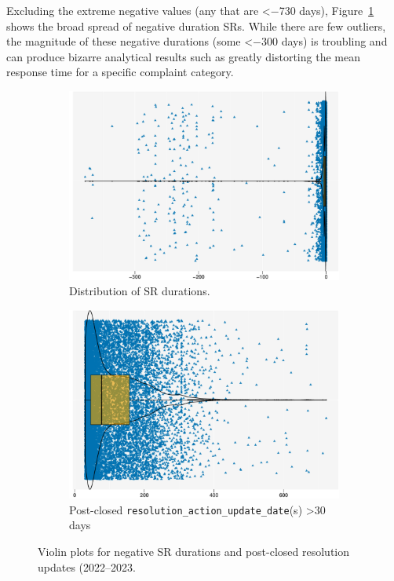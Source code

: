 \documentclass[linenumber]{jdsart}
\begin{document}
Excluding the extreme negative values (any that are <$-$730 days), 
Figure~\ref{fig:negative-duration-violin} shows the broad spread of 
negative duration SRs. While there are few outliers, the magnitude 
of these negative durations (some <$-$300 days) is troubling 
and can produce bizarre analytical results such as greatly 
distorting the mean response time for a specific complaint category.


\begin{figure}[tbp]
  \centering
  \begin{subfigure}[t]{0.495\textwidth} %
    \centering
    \includegraphics[width=\textwidth]{negative_duration_SR_violin.pdf}
    \caption{Distribution of SR durations.}
    \label{fig:negative-duration-violin}
  \end{subfigure}
  \hfill %
  \begin{subfigure}[t]{0.495\textwidth} %
    \centering
    \includegraphics[width=\textwidth]{post_closed_violin_chart.pdf}
    \caption{Post-closed \texttt{resolution\_action\_update\_date}(s) >30 days}
    \label{fig:resolution-violin}
  \end{subfigure}
  \caption{Violin plots for negative SR durations and post-closed
    resolution updates (2022--2023.}
  \label{fig:violin-plots}
\end{figure}
\end{document}
